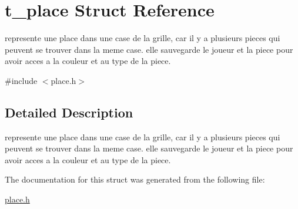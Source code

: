 \hypertarget{structt__place}{}\section{t\+\_\+place Struct Reference}
\label{structt__place}


represente une place dans une case de la grille, car il y a plusieurs pieces qui peuvent se trouver dans la meme case. elle sauvegarde le joueur et la piece pour avoir acces a la couleur et au type de la piece.  




{\ttfamily \#include $<$place.\+h$>$}



\subsection{Detailed Description}
represente une place dans une case de la grille, car il y a plusieurs pieces qui peuvent se trouver dans la meme case. elle sauvegarde le joueur et la piece pour avoir acces a la couleur et au type de la piece. 

The documentation for this struct was generated from the following file\+:\begin{DoxyCompactItemize}
\item 
\hyperlink{place_8h}{place.\+h}\end{DoxyCompactItemize}
